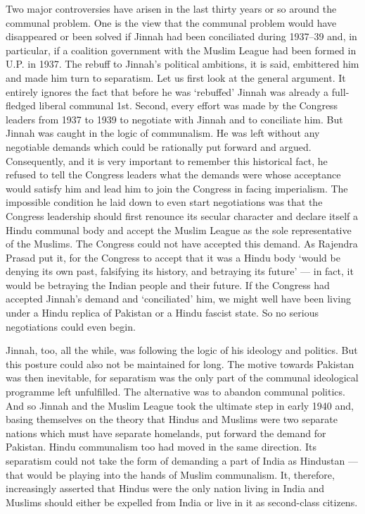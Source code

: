 \begin{multicols}{2}
Two major controversies have arisen in the last thirty years or so around the communal problem. One is the view that the communal problem would have disappeared or been solved if Jinnah had been conciliated during 1937--39 and, in particular, if a coalition government with the Muslim League had been formed in U.P. in 1937. The rebuff to Jinnah's political ambitions, it is said, embittered him and made him turn to separatism. Let us first look at the general argument. It entirely ignores the fact that before he was `rebuffed' Jinnah was already a full- fledged liberal communal 1st. Second, every effort was made by the Congress leaders from 1937 to 1939 to negotiate with Jinnah and to conciliate him. But Jinnah was caught in the logic of communalism. He was left without any negotiable demands which could be rationally put forward and argued. Consequently, and it is very important to remember this historical fact, he refused to tell the Congress leaders what the demands were whose acceptance would satisfy him and lead him to join the Congress in facing imperialism. The impossible condition he laid down to even start negotiations was that the Congress leadership should first renounce its secular character and declare itself a Hindu communal body and accept the Muslim League as the sole representative of the Muslims. The Congress could not have accepted this demand. As Rajendra Prasad put it, for the Congress to accept that it was a Hindu body `would be denying its own past, falsifying its history, and betraying its future' --- in fact, it would be betraying the Indian people and their future. If the Congress had accepted Jinnah's demand and `conciliated' him, we might well have been living under a Hindu replica of Pakistan or a Hindu fascist state. So no serious negotiations could even begin. 

Jinnah, too, all the while, was following the logic of his ideology and politics. But this posture could also not be maintained for long. The motive towards Pakistan was then inevitable, for separatism was the only part of the communal ideological programme left unfulfilled. The alternative was to abandon communal politics. And so Jinnah and the Muslim League took the ultimate step in early 1940 and, basing themselves on the theory that Hindus and Muslims were two separate nations which must have separate homelands, put forward the demand for Pakistan. Hindu communalism too had moved in the same direction. Its separatism could not take the form of demanding a part of India as Hindustan --- that would be playing into the hands of Muslim communalism. It, therefore, increasingly asserted that Hindus were the only nation living in India and Muslims should either be expelled from India or live in it as second-class citizens. 


\end{multicols}
